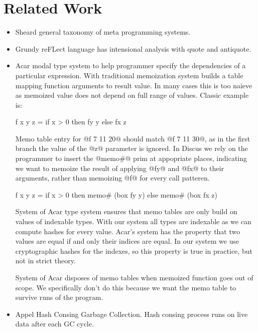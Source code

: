 \eject{}
\section{Related Work}

\begin{itemize}
\item Sheard \cite{Sheard:2001:MetaProgramming} general taxonomy of meta programming systems.

\item Grundy \cite{Grundy:2006:reFLect} reFLect language has intensional analysis with quote and antiquote.

\item Acar \cite{Acar:2003:SelectiveMemoization} modal type system to help programmer specify the dependencies of a particular expression. With traditional memoization system builds a table mapping function arguments to result value. In many cases this is too naieve as memoized value does not depend on full range of values. Classic example is:

\begin{code}
f x y z = if x > 0 then fy y else fx z
\end{code}

Memo table entry for @f 7 11 20@ should match @f 7 11 30@, as in the first branch the value of the @z@ parameter is ignored. In Discus we rely on the programmer to insert the @memo#@ prim at appopriate places, indicating we want to memoize the result of applying @fy@ and @fx@ to their arguments, rather than memoizing @f@ for every call patteren.
\begin{code}
f x y z = if x > 0 then memo# (box fy y) else memo# (box fx z)
\end{code}

System of Acar type system ensures that memo tables are only build on values of indexable types. With our system all types are indexable as we can compute hashes for every value. Acar's system has the property that two values are equal if and only their indices are equal. In our system we use cryptographic hashes for the indexes, so this property is true in practice, but not in strict theory.

System of Acar disposes of memo tables when memoized function goes out of scope. We specifically don't do this because we want the memo table to survive runs of the program.

\item Appel \cite{Appel:1993:HashConsingGarbageCollection} Hash Consing Garbage Collection. Hash consing process runs on live data after each GC cycle.

\end{itemize}